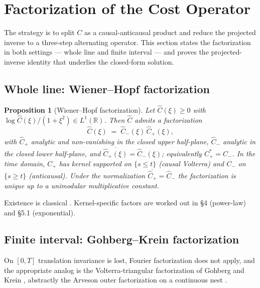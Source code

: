 \documentclass[11pt]{article}
\newcommand{\R}{\mathbb{R}}
\theoremstyle{plain}
\newtheorem{proposition}{Proposition}
\begin{document}
\section{Factorization of the Cost Operator}

The strategy is to split $C$ as a causal-anticausal product and reduce the projected inverse to a three-step alternating operator. This section states the factorization in both settings --- whole line and finite interval --- and proves the projected-inverse identity that underlies the closed-form solution.

\subsection{Whole line: Wiener--Hopf factorization}

\begin{proposition}[Wiener--Hopf factorization]
Let $\hat C(\xi)\ge 0$ with $\log\hat C(\xi)/(1+\xi^2)\in L^1(\R)$. Then $\hat C$ admits a factorization
\begin{equation}\label{eq:wh}
\hat C(\xi) \;=\; \hat C_-(\xi)\,\hat C_+(\xi),
\end{equation}
with $\hat C_+$ analytic and non-vanishing in the closed upper half-plane, $\hat C_-$ analytic in the closed lower half-plane, and $\overline{\hat C_+(\xi)} = \hat C_-(\xi)$; equivalently $C_+^* = C_-$. In the time domain, $C_+$ has kernel supported on $\{s\le t\}$ (causal Volterra) and $C_-$ on $\{s\ge t\}$ (anticausal). Under the normalization $\overline{\hat C_+}=\hat C_-$ the factorization is unique up to a unimodular multiplicative constant.
\end{proposition}

Existence is classical \citep{WienerHopf1931,Krein1962}. Kernel-specific factors are worked out in \S4 (power-law) and \S5.1 (exponential).

\subsection{Finite interval: Gohberg--Krein factorization}

On $[0,T]$ translation invariance is lost, Fourier factorization does not apply, and the appropriate analog is the Volterra-triangular factorization of Gohberg and Krein \citeyearpar{GohbergKrein1970}, abstractly the Arveson outer factorization on a continuous nest \citep{Arveson1975}.
\end{document}
